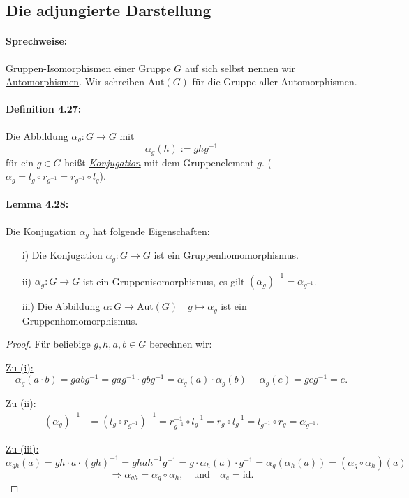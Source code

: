 \documentclass[fleqn, 12pt, letterpaper]{article}
\begin{document}
\subsection{Die adjungierte Darstellung}

\paragraph{Sprechweise:}
Gruppen-Isomorphismen einer Gruppe $G$ auf sich selbst nennen wir \underline{Automorphismen}. Wir schreiben $\mathrm{Aut}(G)$ für die Gruppe aller Automorphismen.

\paragraph{Definition 4.27:}
Die Abbildung $\alpha_g \colon G \to G$ mit
\[
\alpha_g(h) := g h g^{-1}
\]
für ein $g \in G$ heißt \emph{\underline{Konjugation}} mit dem Gruppenelement $g$. ($\alpha_g = l_g \circ r_{g^{-1}} = r_{g^{-1}} \circ l_g $).

\paragraph{Lemma 4.28:}
Die Konjugation $\alpha_g$ hat folgende Eigenschaften:
\begin{itemize}
    \item[i)] Die Konjugation $\alpha_g \colon G \to G$ ist ein Gruppenhomomorphismus.
    \item[ii)] $\alpha_g \colon G \to G$ ist ein Gruppenisomorphismus, es gilt $(\alpha_g)^{-1} = \alpha_{g^{-1}}$.
    \item[iii)] Die Abbildung $\alpha \colon G \to \mathrm{Aut}(G) \quad g \mapsto \alpha_g$ ist ein Gruppenhomomorphismus.
\end{itemize}
\begin{proof}
    Für beliebige $g, h, a, b \in G$ berechnen wir:

\underline{Zu (i):}
\[
    \alpha_g(a \cdot b) = g a b g^{-1} = g a g^{-1} \cdot g b g^{-1} = \alpha_g(a) \cdot \alpha_g(b) \quad \;\alpha_g(e) = g e g^{-1} = e.
\]

\underline{Zu (ii):}
\begin{align*}
    (\alpha_g)^{-1} &= (l_g \circ r_{g^{-1}})^{-1} = r_{g^{-1}}^{-1} \circ l_g^{-1} = r_g \circ l_g^{-1} = l_{g^{-1}} \circ r_g = \alpha_{g^{-1}}.
\end{align*}

\underline{Zu (iii):}
\[
    \alpha_{gh}(a) = gh\cdot a\cdot (gh)^{-1}= g h a h^{-1} g^{-1} = g \cdot \alpha_h(a) \cdot g^{-1} = \alpha_g(\alpha_h(a)) = (\alpha_g \circ \alpha_h)(a)
\]
\[
    \Rightarrow \alpha_{gh} = \alpha_g \circ \alpha_h, \quad \text{und} \quad \alpha_e = \mathrm{id}.
\]
\end{proof}
\end{document}
